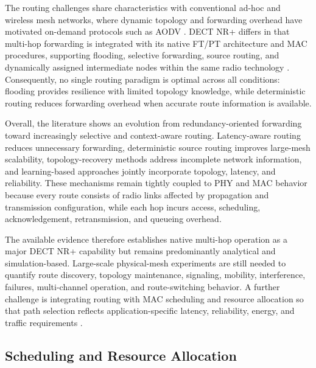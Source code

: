 The routing challenges share characteristics with conventional ad-hoc and
wireless mesh networks, where dynamic topology and forwarding overhead have
motivated on-demand protocols such as AODV
\cite{alameriSystematicReviewModification2022}. DECT NR+ differs in that
multi-hop forwarding is integrated with its native FT/PT architecture and MAC
procedures, supporting flooding, selective forwarding, source routing, and
dynamically assigned intermediate nodes within the same radio technology
\cite{etsi_ts103636_4,etsi_ts103636_5,
asifURLLCBasedMultiHopCommunication2025,
alamDLRoutingPerformance2026a}. Consequently, no single routing paradigm is
optimal across all conditions: flooding provides resilience with limited
topology knowledge, while deterministic routing reduces forwarding overhead
when accurate route information is available.

Overall, the literature shows an evolution from redundancy-oriented
forwarding toward increasingly selective and context-aware routing.
Latency-aware routing reduces unnecessary forwarding, deterministic source
routing improves large-mesh scalability, topology-recovery methods address
incomplete network information, and learning-based approaches jointly
incorporate topology, latency, and reliability. These mechanisms remain
tightly coupled to PHY and MAC behavior because every route consists of radio
links affected by propagation and transmission configuration, while each hop
incurs access, scheduling, acknowledgement, retransmission, and queueing
overhead.

The available evidence therefore establishes native multi-hop operation as a
major DECT NR+ capability but remains predominantly analytical and
simulation-based. Large-scale physical-mesh experiments are still needed to
quantify route discovery, topology maintenance, signaling, mobility,
interference, failures, multi-channel operation, and route-switching behavior.
A further challenge is integrating routing with MAC scheduling and resource
allocation so that path selection reflects application-specific latency,
reliability, energy, and traffic requirements
\cite{fuhrlingRobustRoutingProtocol2025b,
alamDLRoutingPerformance2026a,
rauwolfTopologyAwareDeepReinforcement2026a}.


\subsection{Scheduling and Resource Allocation}
\label{subsec:scheduling}

